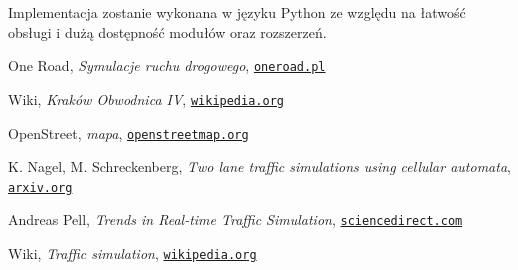 \documentclass[a4paper,12pt]{article}
\begin{document}
	Implementacja zostanie wykonana w języku Python ze względu na łatwość obsługi i dużą dostępność modułów oraz rozszerzeń.
	
	\pagebreak
	\begin{thebibliography}{15}
		One Road, \textit{Symulacje ruchu drogowego},
		\texttt{\href{http://www.oneroad.pl/symulacje-ruchu-drogowego/}{oneroad.pl}}
		
		Wiki, \textit{Kraków Obwodnica IV},
		\texttt{\href{https://pl.wikipedia.org/wiki/Obwodnice_Krakowa\#IV_obwodnica}{wikipedia.org}}
		
		OpenStreet, \textit{mapa},
		\texttt{\href{https://www.openstreetmap.org/}{openstreetmap.org}}
		
		K. Nagel, M. Schreckenberg, \textit{Two lane traffic simulations using cellular automata},
		\texttt{\href{https://arxiv.org/pdf/cond-mat/9512119.pdf}{arxiv.org}}
		
		Andreas Pell, \textit{Trends in Real-time Traffic Simulation},
		\texttt{\href{https://www.sciencedirect.com/science/article/pii/S2352146517304684}{sciencedirect.com}}
		
		Wiki, \textit{Traffic simulation},
		\texttt{\href{https://en.wikipedia.org/wiki/Traffic_simulation}{wikipedia.org}}
	\end{thebibliography}
	
\end{document}
